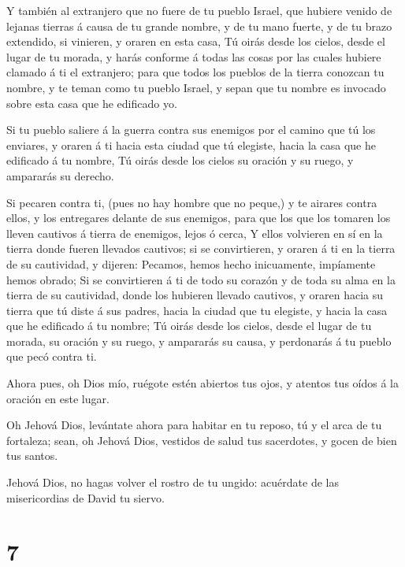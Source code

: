  Y también al extranjero que no fuere de tu pueblo Israel,
que hubiere venido de lejanas tierras á causa de tu grande nombre, y de
tu mano fuerte, y de tu brazo extendido, si vinieren, y oraren en esta
casa,  Tú oirás desde los cielos, desde el lugar de tu
morada, y harás conforme á todas las cosas por las cuales hubiere
clamado á ti el extranjero; para que todos los pueblos de la tierra
conozcan tu nombre, y te teman como tu pueblo Israel, y sepan que tu
nombre es invocado sobre esta casa que he edificado yo.

 Si tu pueblo saliere á la guerra contra sus enemigos por
el camino que tú los enviares, y oraren á ti hacia esta ciudad que tú
elegiste, hacia la casa que he edificado á tu nombre,  Tú
oirás desde los cielos su oración y su ruego, y ampararás su derecho.

 Si pecaren contra ti, (pues no hay hombre que no peque,) y
te airares contra ellos, y los entregares delante de sus enemigos, para
que los que los tomaren los lleven cautivos á tierra de enemigos, lejos
ó cerca,  Y ellos volvieren en sí en la tierra donde fueren
llevados cautivos; si se convirtieren, y oraren á ti en la tierra de su
cautividad, y dijeren: Pecamos, hemos hecho inicuamente, impíamente
hemos obrado;  Si se convirtieren á ti de todo su corazón y
de toda su alma en la tierra de su cautividad, donde los hubieren
llevado cautivos, y oraren hacia su tierra que tú diste á sus padres,
hacia la ciudad que tu elegiste, y hacia la casa que he edificado á tu
nombre;  Tú oirás desde los cielos, desde el lugar de tu
morada, su oración y su ruego, y ampararás su causa, y perdonarás á tu
pueblo que pecó contra ti.

 Ahora pues, oh Dios mío, ruégote estén abiertos tus ojos,
y atentos tus oídos á la oración en este lugar.

 Oh Jehová Dios, levántate ahora para habitar en tu reposo,
tú y el arca de tu fortaleza; sean, oh Jehová Dios, vestidos de salud
tus sacerdotes, y gocen de bien tus santos.

 Jehová Dios, no hagas volver el rostro de tu ungido:
acuérdate de las misericordias de David tu siervo.

\hypertarget{section-6}{%
\section{7}\label{section-6}}

